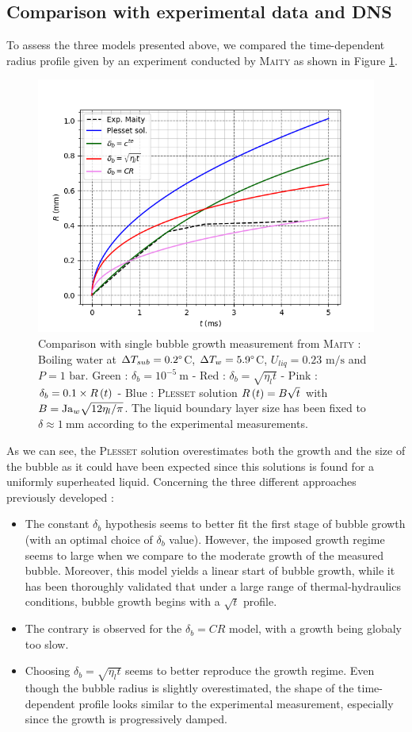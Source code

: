 \subsection{Comparison with experimental data and DNS}

To assess the three models presented above, we compared the time-dependent radius profile given by an experiment conducted by \textsc{Maity} as shown in Figure \ref{fig:growth_comp_Maity}.


\begin{figure}[h!]
\centering
\includegraphics[width=0.7\linewidth]{img/growth/growth_maity.png}
\caption{Comparison with single bubble growth measurement from \textsc{Maity} : Boiling water at $\Delta T_{sub}=0.2\degree$C, $\Delta T_{w}=5.9\degree$C, $U_{liq}=0.23\text{~m/s}$ and $P=1\text{~bar}$. Green : $\delta_{b}=10^{-5}~$m - Red : $\delta_{b}=\sqrt{\eta_{l}t}$ - Pink : $\delta_{b}=0.1\times R\left( t \right)$ - Blue : \textsc{Plesset} solution $R\left( t \right)=B\sqrt{t}$ with $B=\mathrm{Ja}_{w}\sqrt{12\eta_{l}/\pi}$. The liquid boundary layer size has been fixed to $\delta \approx 1~$mm according to the experimental measurements.}
\label{fig:growth_comp_Maity}
\end{figure}

As we can see, the \textsc{Plesset} solution overestimates both the growth and the size of the bubble as it could have been expected since this solutions is found for a uniformly superheated liquid. Concerning the three different approaches  previously developed :

\begin{itemize}
\item The constant $\delta_{b}$ hypothesis seems to better fit the first stage of bubble growth (with an optimal choice of $\delta_{b}$ value). However, the imposed growth regime seems to large when we compare to the moderate growth of the measured bubble. Moreover, this model yields a linear start of bubble growth, while it has been thoroughly validated that under a large range of thermal-hydraulics conditions, bubble growth begins with a $\sqrt{t}$ profile.
\item The contrary is observed for the $\delta_{b}=CR$ model, with a growth being globaly too slow.
\item Choosing $\delta_{b}=\sqrt{\eta_{l}t}$ seems to better reproduce the growth regime. Even though the bubble radius is slightly overestimated, the shape of the time-dependent profile looks similar to the experimental measurement, especially since the growth is progressively damped.
\end{itemize}


